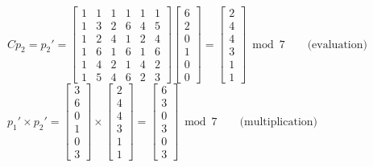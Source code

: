\documentclass[11pt]{article}
\begin{document}
\begin{enumerate}[(a)]
$Cp_2 = p_2' = \begin{bmatrix}1&1&1&1&1&1\\1&3&2&6&4&5\\1&2&4&1&2&4\\1&6&1&6&1&6\\1&4&2&1&4&2\\1&5&4&6&2&3\end{bmatrix}\begin{bmatrix}6\\2\\0\\1\\0\\0\end{bmatrix}=\begin{bmatrix}2\\4\\4\\3\\1\\1\end{bmatrix}\bmod 7 \qquad \text{(evaluation)}$ \\
$p_1' \times p_2' = \begin{bmatrix}3\\6\\0\\1\\0\\3\end{bmatrix}\times\begin{bmatrix}2\\4\\4\\3\\1\\1\end{bmatrix} = \begin{bmatrix}6\\3\\0\\3\\0\\3\end{bmatrix}\bmod 7 \qquad \text{(multiplication)}$ \\

\end{enumerate}
\end{document}
